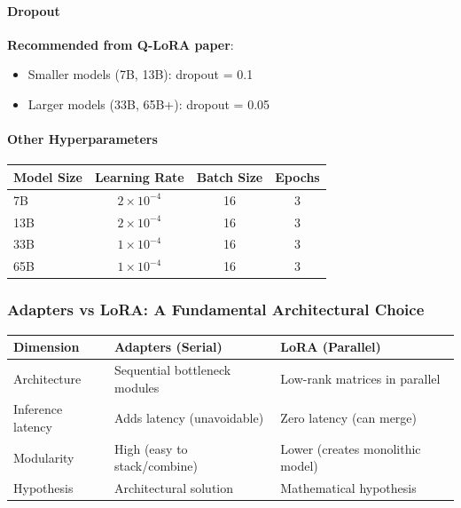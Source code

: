 \documentclass{article}
\begin{document}
\paragraph{Dropout}

\textbf{Recommended from Q-LoRA paper}:
\begin{itemize}
\item Smaller models (7B, 13B): dropout = 0.1
\item Larger models (33B, 65B+): dropout = 0.05
\end{itemize}

\paragraph{Other Hyperparameters}

\begin{center}
\begin{tabular}{lccc}
\toprule
\textbf{Model Size} & \textbf{Learning Rate} & \textbf{Batch Size} & \textbf{Epochs} \\
\midrule
7B & $2 \times 10^{-4}$ & 16 & 3 \\
13B & $2 \times 10^{-4}$ & 16 & 3 \\
33B & $1 \times 10^{-4}$ & 16 & 3 \\
65B & $1 \times 10^{-4}$ & 16 & 3 \\
\bottomrule
\end{tabular}
\end{center}

\subsubsection{Adapters vs LoRA: A Fundamental Architectural Choice}

\begin{center}
\begin{tabular}{lll}
\toprule
\textbf{Dimension} & \textbf{Adapters (Serial)} & \textbf{LoRA (Parallel)} \\
\midrule
Architecture & Sequential bottleneck modules & Low-rank matrices in parallel \\
Inference latency & Adds latency (unavoidable) & Zero latency (can merge) \\
Modularity & High (easy to stack/combine) & Lower (creates monolithic model) \\
Hypothesis & Architectural solution & Mathematical hypothesis \\
\bottomrule
\end{tabular}
\end{center}
\end{document}
